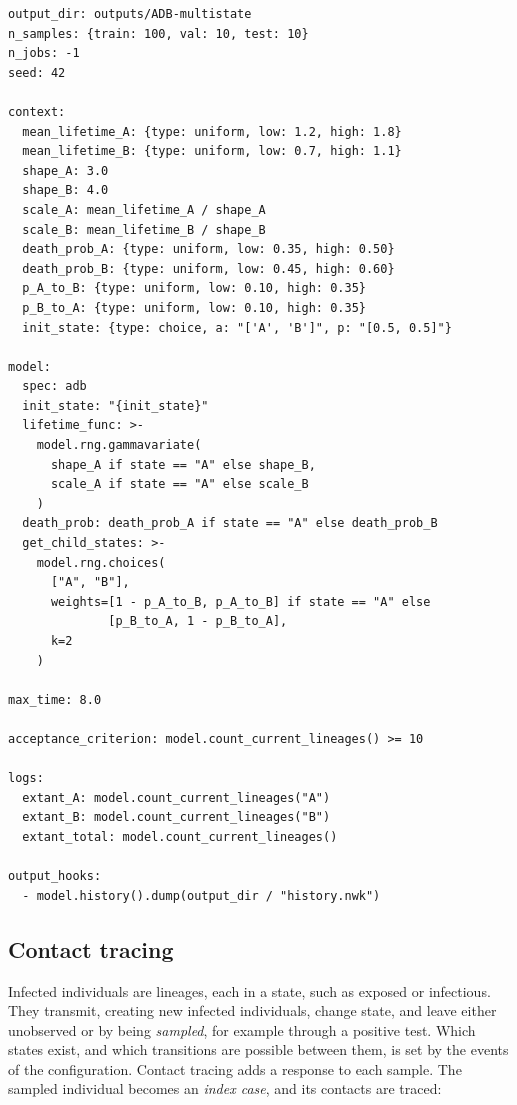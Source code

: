 \documentclass[11pt]{article}
\begin{document}
\begin{lstlisting}[style=cfg]
output_dir: outputs/ADB-multistate
n_samples: {train: 100, val: 10, test: 10}
n_jobs: -1
seed: 42

context:
  mean_lifetime_A: {type: uniform, low: 1.2, high: 1.8}
  mean_lifetime_B: {type: uniform, low: 0.7, high: 1.1}
  shape_A: 3.0
  shape_B: 4.0
  scale_A: mean_lifetime_A / shape_A
  scale_B: mean_lifetime_B / shape_B
  death_prob_A: {type: uniform, low: 0.35, high: 0.50}
  death_prob_B: {type: uniform, low: 0.45, high: 0.60}
  p_A_to_B: {type: uniform, low: 0.10, high: 0.35}
  p_B_to_A: {type: uniform, low: 0.10, high: 0.35}
  init_state: {type: choice, a: "['A', 'B']", p: "[0.5, 0.5]"}

model:
  spec: adb
  init_state: "{init_state}"
  lifetime_func: >-
    model.rng.gammavariate(
      shape_A if state == "A" else shape_B,
      scale_A if state == "A" else scale_B
    )
  death_prob: death_prob_A if state == "A" else death_prob_B
  get_child_states: >-
    model.rng.choices(
      ["A", "B"],
      weights=[1 - p_A_to_B, p_A_to_B] if state == "A" else
              [p_B_to_A, 1 - p_B_to_A],
      k=2
    )

max_time: 8.0

acceptance_criterion: model.count_current_lineages() >= 10

logs:
  extant_A: model.count_current_lineages("A")
  extant_B: model.count_current_lineages("B")
  extant_total: model.count_current_lineages()

output_hooks:
  - model.history().dump(output_dir / "history.nwk")
\end{lstlisting}

\subsection{Contact tracing}
\label{sec:contact-tracing}

Infected individuals are lineages, each in a state, such as exposed or
infectious. They transmit, creating new infected individuals, change state, and
leave either unobserved or by being \emph{sampled}, for example through a
positive test. Which states exist, and which transitions are possible between
them, is set by the events of the configuration. Contact tracing adds a response
to each sample. The sampled individual becomes an \emph{index case}, and its
contacts are traced:
\end{document}
